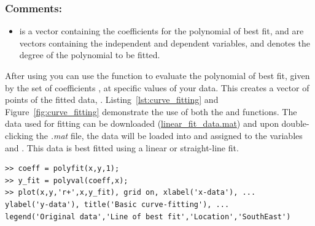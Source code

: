 \subsubsection{Comments:}
\begin{itemize}
\item {} is a vector containing the coefficients for the polynomial of best fit,  and  are vectors containing the independent and dependent variables, and  denotes the degree of the polynomial to be fitted.
\end{itemize}
After using  you can use the  function to evaluate the polynomial of best fit, given by the set of coefficients , at specific values of your data. This creates a vector of points of the fitted data, . Listing~\ref{lst:curve_fitting} and Figure~\ref{fig:curve_fitting} demonstrate the use of both the  and  functions. The data used for fitting can be downloaded (\href{http://www.eng.ed.ac.uk/teaching/courses/matlab/data/linear_fit_data.mat}{linear\_fit\_data.mat}) and upon double-clicking the \textit{.mat} file, the data will be loaded into \mlab and assigned to the variables  and . This data is best fitted using a linear or straight-line fit.
\begin{lstlisting}[caption={Using \mcode{polyfit} and \mcode{polyval} for curve-fitting},label=lst:curve_fitting]
>> coeff = polyfit(x,y,1);
>> y_fit = polyval(coeff,x);
>> plot(x,y,'r+',x,y_fit), grid on, xlabel('x-data'), ...
ylabel('y-data'), title('Basic curve-fitting'), ...
legend('Original data','Line of best fit','Location','SouthEast')
\end{lstlisting}

